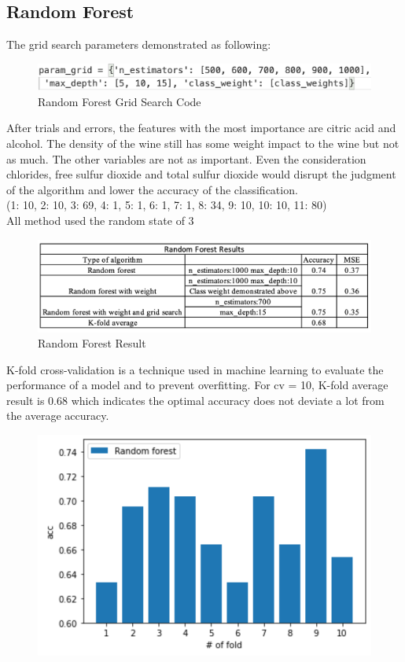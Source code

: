 \documentclass[conference]{IEEEtran}
\begin{document}
{\subsection{Random Forest}
The grid search parameters demonstrated as following:
	\begin{figure}[h]
	\label{fig:foo}
	\begin{center}
	\includegraphics[scale=0.4]{RandomForestGrid.png}
	\caption{Random Forest Grid Search Code}
	\end{center}
	\end{figure}
After trials and errors, the features with the most importance are citric acid and alcohol. The density of the wine still has some weight impact to the wine but not as much. The other variables are not as important. Even the consideration chlorides, free sulfur dioxide and total sulfur dioxide would disrupt the judgment of the algorithm and lower the accuracy of the classification. \\
(1: 10, 2: 10, 3: 69, 4: 1, 5: 1, 6: 1, 7: 1, 8: 34, 9: 10, 10: 10, 11: 80)\\
All method used the random state of 3
	\begin{figure}[h]
	\label{fig:foo}
	\begin{center}
	\includegraphics[scale=0.3]{randomForestResult.png}
	\caption{Random Forest Result}
	\end{center}
	\end{figure}
K-fold cross-validation is a technique used in machine learning to evaluate the performance of a model and to prevent overfitting. For cv = 10, K-fold average result is 0.68 which indicates the optimal accuracy does not deviate a lot from the average accuracy.
	\begin{figure}[h]
	\label{fig:foo}
	\begin{center}
	\includegraphics[scale=0.4]{RandomForestKfold.png}

\end{center}
\end{figure}}
\end{document}
